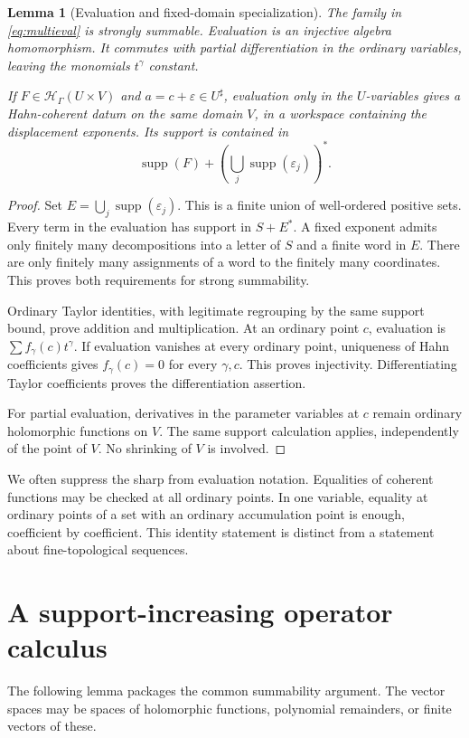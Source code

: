 \documentclass[11pt,oneside]{article}
\numberwithin{equation}{section}
\newtheorem{lemma}[theorem]{Lemma}
\theoremstyle{definition}
\theoremstyle{remark}\newtheorem{remark}[theorem]{Remark}
\newcommand{\HH}{\mathcal H_{\Gamma}}
\newcommand{\sh}{^{\sharp}}
\newcommand{\supp}{\operatorname{supp}}
\begin{document}
\begin{lemma}[Evaluation and fixed-domain specialization]\label{lem:eval}
The family in \eqref{eq:multieval} is strongly summable. Evaluation is an injective algebra homomorphism. It commutes with partial differentiation in the ordinary variables, leaving the monomials \(t^\gamma\) constant.

If \(F\in\HH(U\times V)\) and \(a=c+\varepsilon\in U\sh\), evaluation only in the \(U\)-variables gives a Hahn-coherent datum on the same domain \(V\), in a workspace containing the displacement exponents. Its support is contained in
\[
 \supp(F)+\left(\bigcup_j\supp(\varepsilon_j)\right)^*.
\]
\end{lemma}
\begin{proof}
Set \(E=\bigcup_j\supp(\varepsilon_j)\). This is a finite union of well-ordered positive sets. Every term in the evaluation has support in \(S+E^*\). A fixed exponent admits only finitely many decompositions into a letter of \(S\) and a finite word in \(E\). There are only finitely many assignments of a word to the finitely many coordinates. This proves both requirements for strong summability.

Ordinary Taylor identities, with legitimate regrouping by the same support bound, prove addition and multiplication. At an ordinary point \(c\), evaluation is \(\sum f_\gamma(c)t^\gamma\). If evaluation vanishes at every ordinary point, uniqueness of Hahn coefficients gives \(f_\gamma(c)=0\) for every \(\gamma,c\). This proves injectivity. Differentiating Taylor coefficients proves the differentiation assertion.

For partial evaluation, derivatives in the parameter variables at \(c\) remain ordinary holomorphic functions on \(V\). The same support calculation applies, independently of the point of \(V\). No shrinking of \(V\) is involved.
\end{proof}

We often suppress the sharp from evaluation notation. Equalities of coherent functions may be checked at all ordinary points. In one variable, equality at ordinary points of a set with an ordinary accumulation point is enough, coefficient by coefficient. This identity statement is distinct from a statement about fine-topological sequences.

\section{A support-increasing operator calculus}\label{sec:operators}
The following lemma packages the common summability argument. The vector spaces may be spaces of holomorphic functions, polynomial remainders, or finite vectors of these.
\end{document}
